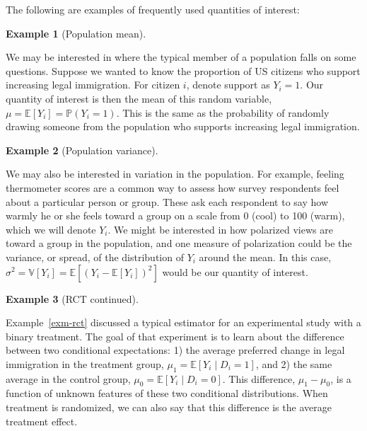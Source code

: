 \documentclass[
  13pt,
  letterpaper,
  DIV=11,
  numbers=noendperiod]{scrreprt}
\newcommand{\E}{\mathbb{E}}
\newcommand{\V}{\mathbb{V}}
\renewcommand{\P}{\mathbb{P}}
\theoremstyle{plain}
\theoremstyle{plain}
\theoremstyle{definition}
\theoremstyle{definition}
\newtheorem{example}{Example}[chapter]
\theoremstyle{remark}
\begin{document}
The following are examples of frequently used quantities of interest:

\begin{example}[Population
mean]\protect\hypertarget{exm-prop}{}\label{exm-prop}

We may be interested in where the typical member of a population falls
on some questions. Suppose we wanted to know the proportion of US
citizens who support increasing legal immigration. For citizen \(i\),
denote support as \(Y_i = 1\). Our quantity of interest is then the mean
of this random variable, \(\mu = \E[Y_i] = \P(Y_{i} = 1)\). This is the
same as the probability of randomly drawing someone from the population
who supports increasing legal immigration.

\end{example}

\begin{example}[Population
variance]\protect\hypertarget{exm-var}{}\label{exm-var}

We may also be interested in variation in the population. For example,
feeling thermometer scores are a common way to assess how survey
respondents feel about a particular person or group. These ask each
respondent to say how warmly he or she feels toward a group on a scale
from 0 (cool) to 100 (warm), which we will denote \(Y_i\). We might be
interested in how polarized views are toward a group in the population,
and one measure of polarization could be the variance, or spread, of the
distribution of \(Y_i\) around the mean. In this case,
\(\sigma^2 = \V[Y_i] = \E[(Y_i - \E[Y_i])^2]\) would be our quantity of
interest.

\end{example}

\begin{example}[RCT
continued]\protect\hypertarget{exm-rct-ii}{}\label{exm-rct-ii}

Example~\ref{exm-rct} discussed a typical estimator for an experimental
study with a binary treatment. The goal of that experiment is to learn
about the difference between two conditional expectations: 1) the
average preferred change in legal immigration in the treatment group,
\(\mu_1 = \E[Y_i \mid D_i = 1]\), and 2) the same average in the control
group, \(\mu_0 = \E[Y_i \mid D_i = 0]\). This difference,
\(\mu_1 - \mu_0\), is a function of unknown features of these two
conditional distributions. When treatment is randomized, we can also say
that this difference is the average treatment effect.

\end{example}
\end{document}
